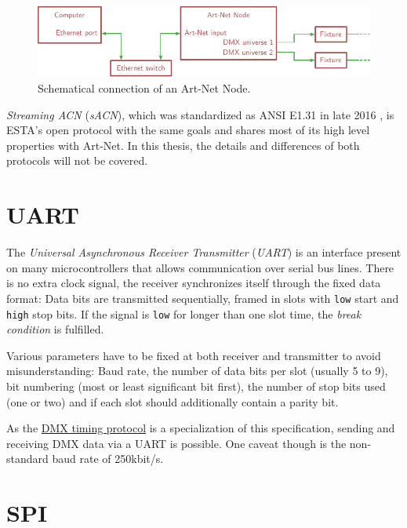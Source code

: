 \begin{figure}
\centering
\includegraphics[width=1.00000\textwidth]{Bilder/art-net-node-schematic.pdf}
\caption[Schematical connection of an Art-Net
Node]{Schematical connection of an Art-Net
Node.}\label{fig:art-net-node-schematic}
\end{figure}

\emph{Streaming ACN} (\emph{sACN}), which was standardized as ANSI E1.31
in late 2016 \citep{esta-sacn}, is ESTA's open protocol with the same
goals and shares most of its high level properties with Art-Net. In this
thesis, the details and differences of both protocols will not be
covered.

\hypertarget{sec:uart}{\section{UART}\label{sec:uart}}

The \emph{Universal Asynchronous Receiver Transmitter} (\emph{UART}) is
an interface present on many microcontrollers that allows communication
over serial bus lines. There is no extra clock signal, the receiver
synchronizes itself through the fixed data format: Data bits are
transmitted sequentially, framed in slots with \colorbox{WhiteSmoke}{\lstinline!low!} start and
\colorbox{WhiteSmoke}{\lstinline!high!} stop bits. If the signal is \colorbox{WhiteSmoke}{\lstinline!low!} for longer
than one slot time, the \emph{break condition} is fulfilled.

Various parameters have to be fixed at both receiver and transmitter to
avoid misunderstanding: Baud rate, the number of data bits per slot
(usually 5 to 9), bit numbering (most or least significant bit first),
the number of stop bits used (one or two) and if each slot should
additionally contain a parity bit.

As the \protect\hyperlink{sec:dmx-protocol}{DMX timing protocol} is a
specialization of this specification, sending and receiving DMX data via
a UART is possible. One caveat though is the non-standard baud rate of
250kbit/s.

\hypertarget{sec:spi}{\section{SPI}\label{sec:spi}}

